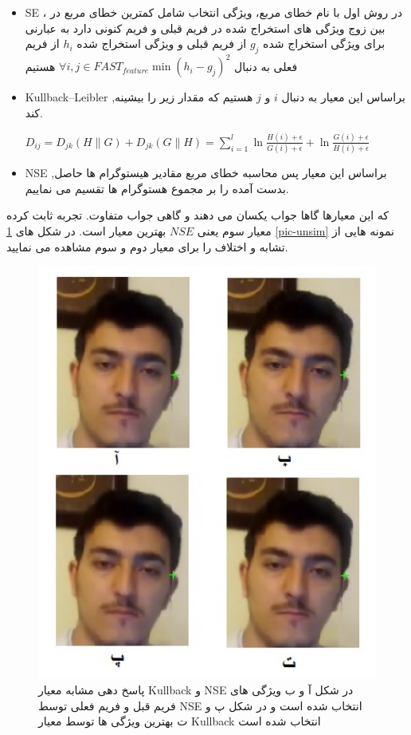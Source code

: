 \documentclass[paper=a4, fontsize=12pt]{article} %
\begin{document}
\begin{itemize}
\item	SE ، در روش اول با نام خطای مربع، ویژگی انتخاب شامل کمترین خطای مربع در بین زوج ویژگی های استخراج شده در فریم قبلی و فریم کنونی دارد به عبارنی برای ویژگی استخراج شده $g_j$ از فریم قبلی و ویژگی استخراج شده $h_i$ از فریم فعلی به دنبال $\forall i,j \in FAST_{feature} \min (h_i-g_j)^2 $ هستیم
\item	Kullback–Leibler ,براساس این معیار به دنبال $i$ و $j$ هستیم که مقدار زیر را بیشینه کند.

\begin{flushleft}
$D_{ij}=D_{jk}(H\|G)+D_{jk}(G\|H)=\sum_{i=1}^{l}{\ln\frac{H(i)+\epsilon}{G(i)+\epsilon}+\ln\frac{G(i)+\epsilon}{H(i)+\epsilon}}$
\end{flushleft}
\item	NSE ,براساس این معیار پس محاسبه خطای مربع مقادیر هیستوگرام ها حاصل بدست آمده را بر مجموع هستوگرام ها تقسیم می نماییم.
\end{itemize}
که این معیارها گاها جواب یکسان می دهند و گاهی جواب متفاوت. تجربه ثابت کرده معیار سوم یعنی $NSE$ بهترین معیار است. در شکل های \ref{pic-sim} \ref{pic-unsim} نمونه هایی از تشابه و اختلاف را برای معیار دوم و سوم مشاهده می نمایید.
\begin{figure}
\centering
\includegraphics[width=12cm]{similar.jpg}
\caption{پاسخ دهی مشابه معیار Kullback و NSE در شکل آ و ب ویژگی های فریم قبل و فریم فعلی توسط NSE انتخاب شده است و در شکل پ و ت بهترین ویژگی ها توسط معیار Kullback انتخاب شده است}
\label{pic-sim}
\end{figure}
\end{document}

